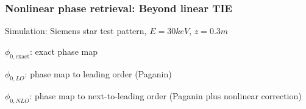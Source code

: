 \documentclass{beamer}
\def\imh{0.35\textheight}
\begin{document}
\begin{frame}
  \frametitle{Nonlinear phase retrieval: Beyond linear TIE}
  Simulation: Siemens star test pattern, $E=30keV$, $z=0.3m$
  \begin{center}
  \end{center}
  
  $\phi_{0,\mathrm{exact}}$: exact phase map

  $\phi_{0,LO}$: phase map to leading order (Paganin)

  $\phi_{0,NLO}$: phase map to next-to-leading order (Paganin plus
  nonlinear correction)

\end{frame}






\end{document}
